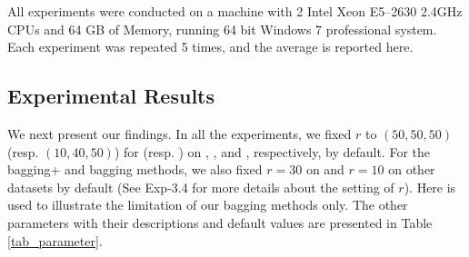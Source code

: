 


All experiments were conducted on a machine with 2 Intel Xeon
E5--2630 2.4GHz CPUs and 64 GB of Memory, running 64 bit
Windows 7 professional system. Each experiment was repeated 5 times,
and the average is reported here.

\subsection{Experimental Results}


We next present our findings. In all the experiments, we fixed $r$ to
$(50, 50, 50)$ (resp. $(10, 40, 50)$) for \NMF (resp. \BIGCLAM) on
\Digg, \YouTube, and \Wikipedia, respectively, by default. For the bagging+ and bagging
methods, we also fixed $r = 30$ on \Digg and $r = 10$ on other datasets by default
(See Exp-3.4 for more details about the setting of $r$).
Here \Flickr is used to illustrate the limitation of our bagging methods only.
The other parameters with their descriptions and default values
are presented in Table \ref{tab_parameter}.


